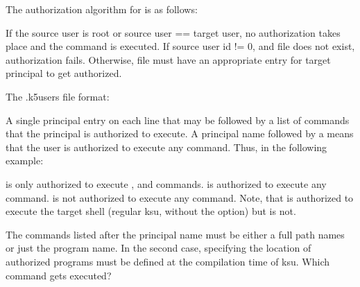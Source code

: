 \documentclass[letterpaper,10pt,english]{sphinxmanual}
\begin{document}
\begin{description}
%
\begin{sphinxVerbatim}[commandchars=\\\{\}]
    
\end{sphinxVerbatim}

The authorization algorithm for  is as follows:

If the source user is root or source user == target user, no
authorization takes place and the command is executed.  If source
user id != 0, and  file does not exist,
authorization fails.  Otherwise,  file
must have an appropriate entry for target principal to get
authorized.

The .k5users file format:

A single principal entry on each line that may be followed by a
list of commands that the principal is authorized to execute.  A
principal name followed by a \sphinxcode{*} means that the user is
authorized to execute any command.  Thus, in the following
example:

%
\begin{sphinxVerbatim}[commandchars=\\\{\}]
   
 
\end{sphinxVerbatim}

 is only authorized to execute ,
 and  commands.   is
authorized to execute any command.   is
not authorized to execute any command.  Note, that
 is authorized to execute the target
shell (regular ksu, without the  option) but
 is not.

The commands listed after the principal name must be either a full
path names or just the program name.  In the second case,
 specifying the location of authorized programs must
be defined at the compilation time of ksu.  Which command gets
executed?


\end{description}
\end{document}
